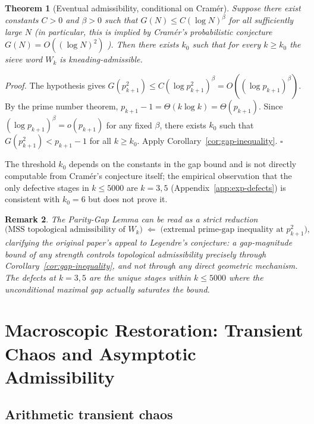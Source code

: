 \documentclass[cupthm,crop,info]{CUP-JNL-ETS}
\theoremstyle{cupplain}
\newtheorem{theorem}{Theorem}[section]
\theoremstyle{cupdefinition}
\theoremstyle{cupremark}
\newtheorem{remark}[theorem]{Remark}
\providecommand{\qed}{\hfill\(\square\)}
\newenvironment{proof}{\par\noindent\textit{Proof.}\quad}{\qed\par\medskip}
\numberwithin{equation}{section}
\begin{document}
\begin{theorem}[Eventual admissibility, conditional on Cram\'er]
\label{thm:eventual}
Suppose there exist constants $C > 0$ and $\beta > 0$ such that
$G(N) \leq C (\log N)^{\beta}$ for all sufficiently large $N$
(in particular, this is implied by Cram\'er's probabilistic conjecture
$G(N) = O((\log N)^2)$ \cite{cramer1936order}). Then there exists
$k_0$ such that for every $k \geq k_0$ the sieve word $W_k$ is
kneading-admissible.
\end{theorem}

\begin{proof}
The hypothesis gives
$G(p_{k+1}^2) \leq C (\log p_{k+1}^2)^\beta = O((\log p_{k+1})^\beta)$.
By the prime number theorem,
$p_{k+1} - 1 = \Theta(k \log k) = \Theta(p_{k+1})$. Since
$(\log p_{k+1})^\beta = o(p_{k+1})$ for any fixed $\beta$, there exists
$k_0$ such that $G(p_{k+1}^2) < p_{k+1} - 1$ for all $k \geq k_0$.
Apply Corollary~\ref{cor:gap-inequality}.
\end{proof}

The threshold $k_0$ depends on the constants in the gap bound and is
not directly computable from Cram\'er's conjecture itself; the
empirical observation that the only defective stages in $k \leq 5000$
are $k = 3, 5$ (Appendix~\ref{app:exp-defects}) is consistent with
$k_0 = 6$ but does not prove it.

\begin{remark}
The Parity-Gap Lemma can be read as a strict reduction
\[
    \text{(MSS topological admissibility of } W_k\text{)}
    \;\Longleftarrow\;
    \text{(extremal prime-gap inequality at } p_{k+1}^2\text{)},
\]
clarifying the original paper's appeal to Legendre's conjecture: a
gap-magnitude bound of any strength controls topological admissibility
\emph{precisely} through Corollary~\ref{cor:gap-inequality}, and not
through any direct geometric mechanism. The defects at $k = 3, 5$ are
the unique stages within $k \leq 5000$ where the unconditional maximal
gap actually saturates the bound.
\end{remark}

\section{Macroscopic Restoration: Transient Chaos and Asymptotic Admissibility}
\label{sec:macro}

\subsection{Arithmetic transient chaos}
\end{document}
